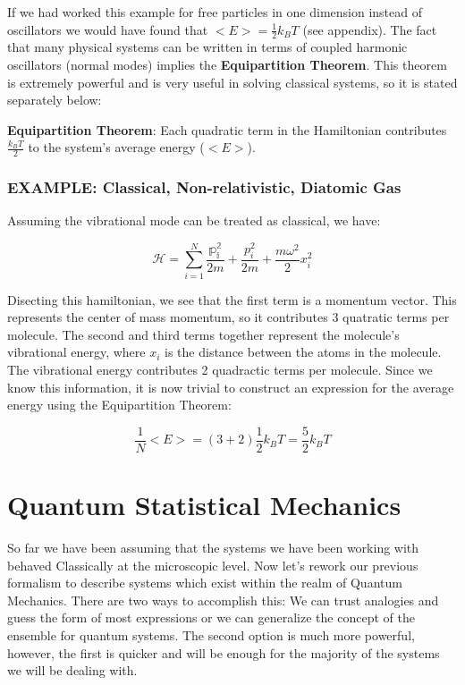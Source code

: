 \documentclass{article}
\newcommand{\bltz}{k_{B}}
\newcommand{\sumser}[2]{\sum\limits_{#1}^{#2}}
\begin{document}

If we had worked this example for free particles in one dimension instead of oscillators we would have found that $<E>=\frac{1}{2}\bltz T$ (see appendix).  The fact that many physical systems can be written in terms of coupled harmonic oscillators (normal modes) implies the \textbf{Equipartition Theorem}.  This theorem is extremely powerful and is very useful in solving classical systems, so it is stated separately below:

\textbf{Equipartition Theorem}: Each quadratic term in the Hamiltonian contributes $\frac{\bltz T}{2}$ to the system's average energy ($<E>$).

\subsubsection{EXAMPLE: Classical, Non-relativistic, Diatomic Gas}

Assuming the vibrational mode can be treated as classical, we have:

$$\mathcal{H}=\sumser{i=1}{N}\frac{\mathbb{p_{i}^{2}}}{2m}+\frac{p_{i}^{2}}{2m}+\frac{m\omega^{2}}{2}x_{i}^{2}$$

Disecting this hamiltonian, we see that the first term is a momentum vector.  This represents the center of mass momentum, so it contributes 3 quatratic terms per molecule.  The second and third terms together represent the molecule's vibrational energy, where $x_{i}$ is the distance between the atoms in the molecule.  The vibrational energy contributes 2 quadractic terms per molecule.  Since we know this information, it is now trivial to construct an expression for the average energy using the Equipartition Theorem:

$$\frac{1}{N}<E>=(3+2)\frac{1}{2}\bltz T=\frac{5}{2}\bltz T$$

\section{Quantum Statistical Mechanics}

So far we have been assuming that the systems we have been working with behaved Classically at the microscopic level.  Now let's rework our previous formalism to describe systems which exist within the realm of Quantum Mechanics.  There are two ways to accomplish this:  We can trust analogies and guess the form of most expressions or we can generalize the concept of the ensemble for quantum systems.  The second option is much more powerful, however, the first is quicker and will be enough for the majority of the systems we will be dealing with.
\end{document}
